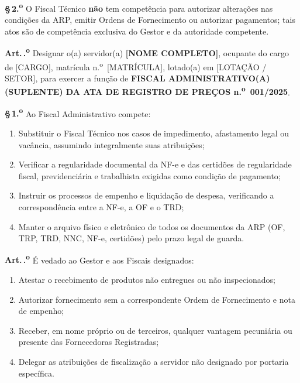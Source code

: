 \documentclass[12pt,a4paper]{article}
\newcounter{artigo}
\newcommand{\artigo}[1]{%
  \stepcounter{artigo}%
  \medskip\noindent\textbf{Art.\,\theartigo.\textsuperscript{o}} #1}
\newcommand{\paragrafo}[2]{%
  \par\noindent\textbf{\S\,#1.\textsuperscript{o}} #2}
\newcommand{\exercicio}{2025}
\newcommand{\arpNum}{001}
\newcommand{\fiscalAdmNome}{[NOME COMPLETO]}
\newcommand{\fiscalAdmCargo}{[CARGO]}
\newcommand{\fiscalAdmMat}{[MATRÍCULA]}
\newcommand{\fiscalAdmLotacao}{[LOTAÇÃO / SETOR]}
\begin{document}
\paragrafo{2}{O Fiscal Técnico \textbf{não} tem competência para autorizar
alterações nas condições da ARP, emitir Ordens de Fornecimento ou autorizar
pagamentos; tais atos são de competência exclusiva do Gestor e da autoridade
competente.}

\vspace{0.5cm}

\artigo{Designar o(a) servidor(a) \textbf{\fiscalAdmNome}, ocupante do cargo
de \fiscalAdmCargo, matrícula n.\textsuperscript{o}~\fiscalAdmMat, lotado(a)
em \fiscalAdmLotacao, para exercer a função de \textbf{FISCAL ADMINISTRATIVO(A)
(SUPLENTE) DA ATA DE REGISTRO DE PREÇOS n.\textsuperscript{o}~\arpNum/\exercicio}.}

\paragrafo{1}{Ao Fiscal Administrativo compete:}

\begin{enumerate}[label=\Roman*.]
  \item Substituir o Fiscal Técnico nos casos de impedimento, afastamento legal
    ou vacância, assumindo integralmente suas atribuições;

  \item Verificar a regularidade documental da NF-e e das certidões de
    regularidade fiscal, previdenciária e trabalhista exigidas como condição
    de pagamento;

  \item Instruir os processos de empenho e liquidação de despesa,
    verificando a correspondência entre a NF-e, a OF e o TRD;

  \item Manter o arquivo físico e eletrônico de todos os documentos da ARP
    (OF, TRP, TRD, NNC, NF-e, certidões) pelo prazo legal de guarda.
\end{enumerate}

\vspace{0.5cm}

\artigo{É vedado ao Gestor e aos Fiscais designados:}

\begin{enumerate}[label=\Roman*.]
  \item Atestar o recebimento de produtos não entregues ou não inspecionados;
  \item Autorizar fornecimento sem a correspondente Ordem de Fornecimento e
    nota de empenho;
  \item Receber, em nome próprio ou de terceiros, qualquer vantagem pecuniária
    ou presente das Fornecedoras Registradas;
  \item Delegar as atribuições de fiscalização a servidor não designado por
    portaria específica.
\end{enumerate}
\end{document}
